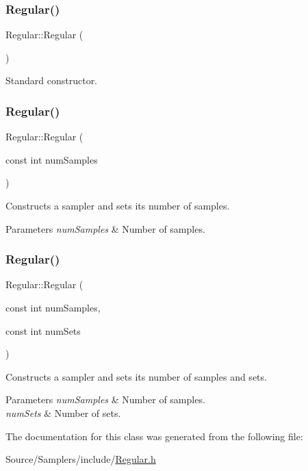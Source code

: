 \subsubsection{\texorpdfstring{Regular()}{Regular()}\hspace{0.1cm}{\footnotesize\ttfamily [1/3]}}
{\footnotesize\ttfamily Regular\+::\+Regular (\begin{DoxyParamCaption}{ }\end{DoxyParamCaption})}

Standard constructor. \hypertarget{class_regular_a92a20b6c0adcd956b36c315a90eaff88}{}\label{class_regular_a92a20b6c0adcd956b36c315a90eaff88} 
\subsubsection{\texorpdfstring{Regular()}{Regular()}\hspace{0.1cm}{\footnotesize\ttfamily [2/3]}}
{\footnotesize\ttfamily Regular\+::\+Regular (\begin{DoxyParamCaption}\item[{const int}]{num\+Samples }\end{DoxyParamCaption})}

Constructs a sampler and sets its number of samples. 
\begin{DoxyParams}{Parameters}
{\em num\+Samples} & Number of samples. \\
\hline
\end{DoxyParams}
\hypertarget{class_regular_a2df0fa6fdfe2f6cf707677997486b395}{}\label{class_regular_a2df0fa6fdfe2f6cf707677997486b395} 
\subsubsection{\texorpdfstring{Regular()}{Regular()}\hspace{0.1cm}{\footnotesize\ttfamily [3/3]}}
{\footnotesize\ttfamily Regular\+::\+Regular (\begin{DoxyParamCaption}\item[{const int}]{num\+Samples,  }\item[{const int}]{num\+Sets }\end{DoxyParamCaption})}

Constructs a sampler and sets its number of samples and sets. 
\begin{DoxyParams}{Parameters}
{\em num\+Samples} & Number of samples. \\
\hline
{\em num\+Sets} & Number of sets. \\
\hline
\end{DoxyParams}


The documentation for this class was generated from the following file\+:\begin{DoxyCompactItemize}
\item 
Source/\+Samplers/include/\hyperlink{_regular_8h}{Regular.\+h}\end{DoxyCompactItemize}
